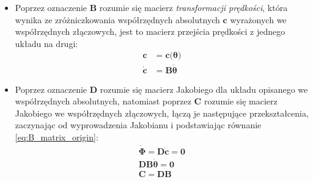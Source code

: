 \begin{itemize}
\begin{equation}
        \label{eq:breve_operator}
            \boldsymbol{\breve a} = 
            \boldsymbol{a}\mathbf{A}(\frac{\pi}{2})=
            \begin{bmatrix}
                a_1\\a_2
            \end{bmatrix}
            \begin{bmatrix}
                0&-1\\1&0
            \end{bmatrix}
            =
            \begin{bmatrix}
                -a_2\\a_1
            \end{bmatrix}
    \end{equation}
    \item Poprzez oznaczenie $\mathbf{B}$ rozumie się macierz \textit{transformacji prędkości}, która wynika ze zróżniczkowania współrzędnych absolutnych $\boldsymbol{c}$ wyrażonych we współrzędnych złączowych, jest to macierz przejścia prędkości z jednego układu na drugi:
    \begin{equation}
        \label{eq:B_matrix_origin}
            \begin{aligned}
                \boldsymbol{c} &= \boldsymbol{c(\boldsymbol{\theta)}}\\
                \boldsymbol{\dot c} & = \mathbf{B}\boldsymbol{\dot \theta}
            \end{aligned}
    \end{equation}
    \item Poprzez oznaczenie $\mathbf{D}$ rozumie się macierz Jakobiego dla układu opisanego we współrzędnych absolutnych, natomiast poprzez $\mathbf{C}$ rozumie się macierz Jakobiego we współrzędnych złączowych, łączą je następujące przekształcenia, zaczynając od wyprowadzenia Jakobianu i podstawiając równanie \ref{eq:B_matrix_origin}:
    \begin{equation}
        \label{eq:C_D_matrices}
        \begin{aligned}
            \boldsymbol{\dot\Phi} = \mathbf{D}\boldsymbol{\dot c}=\boldsymbol{0}\\
            \mathbf{D}\mathbf{B}\boldsymbol{\dot\theta}=\boldsymbol{0}\\
            \mathbf{C} = \mathbf{D}\mathbf{B}
        \end{aligned}
    \end{equation}
\end{itemize}


